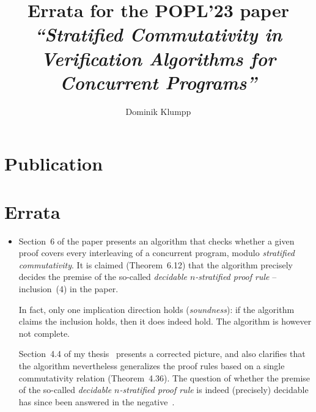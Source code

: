 \documentclass[oneside]{article}
\title{Errata for the POPL'23 paper\\ \em``Stratified Commutativity in Verification Algorithms for Concurrent Programs''}
\author{Dominik Klumpp}
\begin{document}
\maketitle

\section*{Publication}

\section*{Errata}

\begin{itemize}
\item Section~6 of the paper presents an algorithm that checks whether a given proof covers every interleaving of a concurrent program, modulo \emph{stratified commutativity}.
  It is claimed (Theorem~6.12) that the algorithm precisely decides the premise of the so-called \emph{decidable $n$-stratified proof rule} -- inclusion~(4) in the paper.

  In fact, only one implication direction holds (\emph{soundness}):
  if the algorithm claims the inclusion holds, then it does indeed hold.
  The algorithm is however not complete.

  Section~4.4 of my thesis~\cite{diss:commutativityToProofsAndBack} presents a corrected picture,
  and also clarifies that the algorithm nevertheless generalizes the proof rules based on a single commutativity relation (Theorem~4.36).
%
  The question of whether the premise of the so-called \emph{decidable $n$-stratified proof rule} is indeed (precisely) decidable has since been answered in the negative~\cite{stratification-undecidable}.
\end{itemize}




\end{document}
